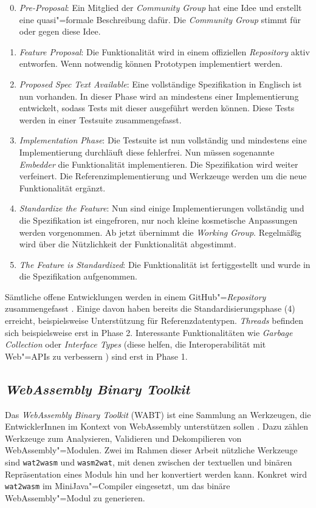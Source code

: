 \begin{enumerate}
    \setcounter{enumi}{-1}
    \item \emph{Pre-Proposal}: Ein Mitglied der \emph{Community Group} hat eine Idee und erstellt eine quasi"=formale Beschreibung dafür. Die \emph{Community Group} stimmt für oder gegen diese Idee.
    \item \emph{Feature Proposal}: Die Funktionalität wird in einem offiziellen \emph{Repository} aktiv entworfen. Wenn notwendig können Prototypen implementiert werden.
    \item \emph{Proposed Spec Text Available}: Eine vollständige Spezifikation in Englisch ist nun vorhanden. In dieser Phase wird an mindestens einer Implementierung entwickelt, sodass Tests mit dieser ausgeführt werden können. Diese Tests werden in einer Testsuite zusammengefasst.
    \item \emph{Implementation Phase}: Die Testsuite ist nun vollständig und mindestens eine Implementierung durchläuft diese fehlerfrei. Nun müssen sogenannte \emph{Embedder} die Funktionalität implementieren. Die Spezifikation wird weiter verfeinert. Die Referenzimplementierung und Werkzeuge werden um die neue Funktionalität ergänzt.
    \item \emph{Standardize the Feature}: Nun sind einige Implementierungen vollständig und die Spezifikation ist eingefroren, nur noch kleine kosmetische Anpassungen werden vorgenommen. Ab jetzt übernimmt die \emph{Working Group}. Regelmäßig wird über die Nützlichkeit der Funktionalität abgestimmt.
    \item \emph{The Feature is Standardized}: Die Funktionalität ist fertiggestellt und wurde in die Spezifikation aufgenommen.
\end{enumerate}

Sämtliche offene Entwicklungen werden in einem GitHub"=\emph{Repository} zusammengefasst \cite{WebAssemblyProposals}.
Einige davon haben bereits die Standardisierungsphase (4) erreicht, beispielsweise Unterstützung für Referenzdatentypen. \emph{Threads} befinden sich beispielsweise erst in Phase 2. Interessante Funktionalitäten wie \emph{Garbage Collection} oder \emph{Interface Types} (diese helfen, die Interoperabilität mit Web"=APIs zu verbessern \cite{WebAssemblyInterfaceTypes}) sind erst in Phase 1.

\subsection{\emph{WebAssembly Binary Toolkit}}
Das \emph{WebAssembly Binary Toolkit} (WABT) ist eine Sammlung an Werkzeugen, die EntwicklerInnen im Kontext von WebAssembly unterstützen sollen \cite{WABT}. Dazu zählen Werkzeuge zum Analysieren, Validieren und Dekompilieren von WebAssembly"=Modulen. Zwei im Rahmen dieser Arbeit nützliche Werkzeuge sind \lstinline{wat2wasm} und \lstinline{wasm2wat}, mit denen zwischen der textuellen und binären Repräsentation eines Moduls hin und her konvertiert werden kann. Konkret wird \lstinline{wat2wasm} im MiniJava"=Compiler eingesetzt, um das binäre WebAssembly"=Modul zu generieren.

